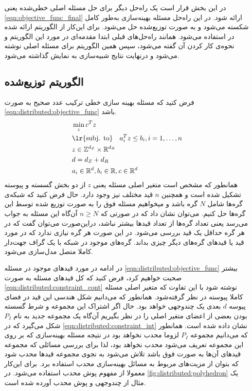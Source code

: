 در این بخش قرار است یک راه‌حل دیگر برای حل مسئله اصلی خطی‌شده یعنی \cref{eqn:objective_func_final} ارائه شود. در این راه‌حل مسئله بهینه‌سازی به‌طور کامل شکسته می‌شود و به صورت توزیع‌شده حل می‌شود. برای این‌کار از الگوریتم ارائه شده در \cite{testa2019distributed} استفاده می‌شود. همانند راه‌حل‌های قبلی ابتدا مقدمه‌ای  در مورد این الگوریتم و نحوه‌ی کار کردن آن گفته می‌شود، سپس همین الگوریتم برای مسئله اصلی نوشته می‌شود و درنهایت نتایج شبیه‌سازی به نمایش گذاشته می‌شود. 
\subsection{الگوریتم توزیع‌شده}
فرض کنید که مسئله بهینه سازی خطی ترکیب عدد صحیح به صورت \cref{eqn:distributed:objective_func} باشد.
\begin{subequations}\label{eqn:distributed:objective_func}
	\begin{align}
		&\min_{z}c^Tz  \\
		&\text{\lr{subj. to}} \quad a_i^Tz \le b_i, i = 1, \dots, n  \\
		&z \in \mathbb{Z}^{d_Z} \times \mathbb{R}^{d_R} \\
		&d = d_Z + d_R  \\
		&a_i \in \mathbb{R}^d , b_i \in \mathbb{R}, c \in \mathbb{R}^d
	\end{align}
\end{subequations}
	همانطور که مشخص است متغیر اصلی مسئله یعنی $z$ از دو بخش گسسته و پیوسته تشکیل شده است و همچنین $n$ قید مختلف نیز وجود دارد. حال فرض کنید که شبکه‌ی گره‌ها شامل $N$ گره باشد و میخواهیم مسئله فوق را به صورت توزیع شده توسط این گره‌ها حل کنیم. می‌توان نشان داد که در صورتی که $n \ge N$ آن‌گاه این مسئله به جواب می‌رسد یعنی تعداد گره‌ها از تعداد قیدها بیشتر نباشد، دراین‌صورت می‌توان گفت که در هر گره حداقل یک قید بررسی می‌شود. در این صورت هر گره نیازی ندارد که در مورد قید یا قیدهای گره‌های دیگر چیزی بداند.
	گره‌های موجود در شبکه با یک گراف جهت‌دار کاملا متصل مدل‌سازی می‌شود. 
	
	در ادامه در مورد قیدهای موجود در مسئله \cref{eqn:distributed:objective_func} بیشتر صحبت خواهیم کرد، فرض کنید که کل قیدهای مسئله به صورت \cref{eqn:distributed:constraint_cont} نوشته شود با این تفاوت که متغیر اصلی مسئله کاملا پیوسته در نظر گرفته‌شود. همانطور که می‌دانیم شکل هندسی این قید در فضای پیوسه $d$ بعدی یک چندوجهی خواهد بود. حال اگر اشتراک این مجموعه و شرط گسسته بودن بعضی از اعضای متغیر اصلی را در نظر بگیریم آن‌گاه یک مجموعه جدید به نام $P_I$ شکل می‌گیرد که در \cref{eqn:distributed:constraint_int} نشان داده شده است. همانطور که می‌دانیم مجموعه $P_I$ لزوما محدب نخواهد بود در نتیجه مسئله بهینه‌سازی که بر روی این مجموعه تعریف می‌شود محدب نخواهد بود، لذا برای بررسی مسائلی که مجموعه قیدهای آن‌ها به صورت فوق باشد تلاش می‌شود به نجوی مجموعه قیدها محدب شود که بتوان از مزیت‌های مربوط به مسائل بهینه‌سازی محدب استفاده برد. برای این‌کار معمولا از مفهوم پوش محدب استفاده می‌شود. در \cref{fig:distributed:polyhedron} یک مثال از چندوجهی و پوش محدب آورده شده است. 
	
